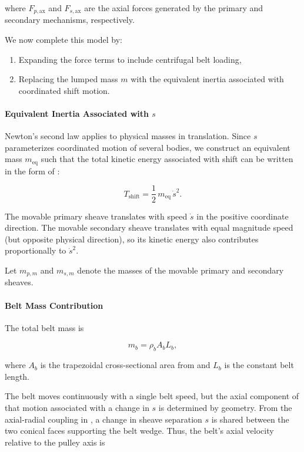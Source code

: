 \documentclass[11pt]{article}
\numberwithin{equation}{section}
\newcounter{theory}
\begin{document}
where $F_{p,\text{ax}}$ and $F_{s,\text{ax}}$ are the axial forces
generated by the primary and secondary mechanisms, respectively.

We now complete this model by:
\begin{enumerate}
    \item Expanding the force terms to include centrifugal belt loading,
    \item Replacing the lumped mass $m$ with the equivalent inertia
          associated with coordinated shift motion.
\end{enumerate}

\paragraph{Equivalent Inertia Associated with $s$}

Newton's second law applies to physical masses in translation.
Since $s$ parameterizes coordinated motion of several bodies,
we construct an equivalent mass $m_{\mathrm{eq}}$ such that the total
kinetic energy associated with shift can be written in the form
of :

\[
T_{\text{shift}} = \frac12\,m_{\mathrm{eq}}\,\dot s^2.
\]

The movable primary sheave translates with speed $\dot s$
in the positive coordinate direction.
The movable secondary sheave translates with equal magnitude speed
(but opposite physical direction), so its kinetic energy also contributes
proportionally to $\dot s^2$.

Let $m_{p,m}$ and $m_{s,m}$ denote the masses of the movable
primary and secondary sheaves.

\paragraph{Belt Mass Contribution}

The total belt mass is

\begin{equation}
m_b = \rho_b A_b L_b,
\label{eq:mb_def}
\end{equation}

where $A_b$ is the trapezoidal cross-sectional area from
 and $L_b$ is the constant belt length.

The belt moves continuously with a single belt speed,
but the axial component of that motion associated with
a change in $s$ is determined by geometry.
From the axial-radial coupling in ,
a change in sheave separation $s$ is shared between the two
conical faces supporting the belt wedge.
Thus, the belt's axial velocity relative to the pulley axis is
\end{document}

